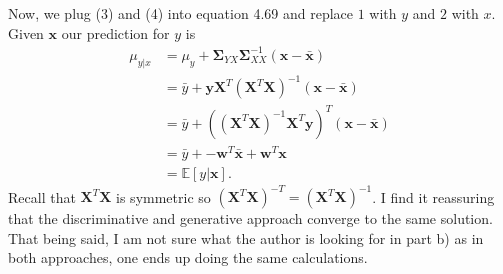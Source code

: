 \documentclass[a4paper,11pt]{article}
\begin{document}
Now, we plug (3) and (4) into equation 4.69 and replace $1$ with
$y$ and $2$ with $x$.  Given $\mathbf{x}$ our prediction for $y$ is
\begin{align*}
    \mu_{y|x} & = \mu_y + \mathbf{\Sigma}_{YX} \mathbf{\Sigma}_{XX}^{-1}
    (\mathbf{x} - \bar{\mathbf{x}}) \\
    & = \bar{y} + \mathbf{y}\mathbf{X}^T(\mathbf{X}^T\mathbf{X})^{-1}
    (\mathbf{x} - \bar{\mathbf{x}}) \\
    & = \bar{y} + ((\mathbf{X}^T\mathbf{X})^{-1}\mathbf{X}^T\mathbf{y})^T
    (\mathbf{x} - \bar{\mathbf{x}}) \\
    & = \bar{y} +  - \mathbf{w}^T\bar{\mathbf{x}} + \mathbf{w}^T\mathbf{x} \\
    & = \mathbb{E}[y|\mathbf{x}].
\end{align*}
Recall that $\mathbf{X}^T\mathbf{X}$ is symmetric so $(\mathbf{X}^T\mathbf{X})^{-T} = 
(\mathbf{X}^T\mathbf{X})^{-1}$.
I find it reassuring that the discriminative and generative approach converge to the
same solution. That being said, I am not sure what the author is looking for in part b)
as in both approaches, one ends up doing the same calculations.
\end{document}
